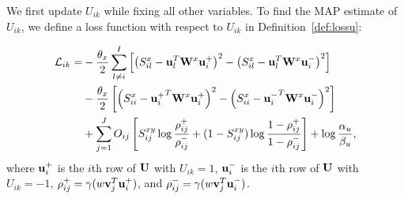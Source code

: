 We first update $ U_{ik} $ while fixing all other variables. To find the \mbox{MAP} estimate of $ U_{ik} $, we define a loss function with respect to $ U_{ik}$ in Definition~\ref{def:lossu}:
\begin{mydef}
\begin{align}
\mathcal{L}_{ik} =&-\frac{\theta_{x}}{2}\sum_{l\neq i}^{I}\left[\left(S^{x}_{il}-{\bf u}_l^T{\bf W}^x{\bf u}_{i}^{+}\right)^2-\left(S^{x}_{il}-{\bf u}_l^T{\bf W}^x{\bf u}_{i}^{-}\right)^2\right]\nonumber\\
&-\frac{\theta_{x}}{2}\left[\left(S^{x}_{ii}-{{\bf u}_{i}^{+}}^T{\bf W}^x{\bf u}_{i}^{+}\right)^2-\left(S^{x}_{ii}-{{\bf u}_{i}^{-}}^T{\bf W}^x{\bf u}_{i}^{-}\right)^2\right]\nonumber\\
&+\sum_{j=1}^{J}O_{ij}\left[S_{ij}^{xy}\log \frac{\rho_{ij}^{+}}{\rho_{ij}^{-}} + (1-S_{ij}^{xy})\log \frac{1-\rho_{ij}^{+}}{1-\rho_{ij}^{-}}\right]+\log\frac{\alpha_u}{\beta_u},\nonumber
\end{align}
where $ {\bf u}^{+}_i $ is the $ i $th row of $ {\bf U}  $ with $ U_{ik}=1 $, $ {\bf u}^{-}_i $ is the $ i $th row of $ {\bf U} $ with $ U_{ik}=-1 $, $ \rho^{+}_{ij} = \gamma(w{\bf v}_j^T{\bf u}_i^{+}) $, and $ \rho^{-}_{ij} = \gamma(w{\bf v}_j^T{\bf u}_i^{-}) $.
\label{def:lossu}\end{mydef}

